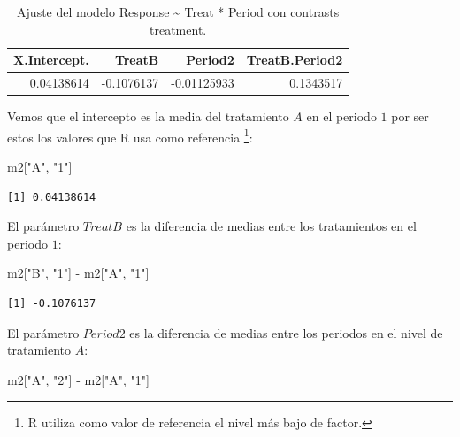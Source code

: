\documentclass[
  12pt,
  a4paper,
  extrafontsizes,
  onecolumn,
  openright,
  table]{memoir}
\newenvironment{Shaded}{\begin{snugshade}}{\end{snugshade}}
\newcommand{\NormalTok}[1]{\textcolor[rgb]{0.00,0.23,0.31}{#1}}
\newcommand{\SpecialCharTok}[1]{\textcolor[rgb]{0.37,0.37,0.37}{#1}}
\newcommand{\StringTok}[1]{\textcolor[rgb]{0.13,0.47,0.30}{#1}}
\begin{document}
\hypertarget{tbl-l2}{}
\begin{longtable}{rrrr}
\caption{\label{tbl-l2}Ajuste del modelo Response \textasciitilde{} Treat * Period con
contrasts treatment. }\tabularnewline

\toprule
X.Intercept. & TreatB & Period2 & TreatB.Period2 \\ 
\midrule
0.04138614 & -0.1076137 & -0.01125933 & 0.1343517 \\ 
\bottomrule
\end{longtable}

\normalsize

Vemos que el intercepto es la media del tratamiento \(A\) en el periodo
\(1\) por ser estos los valores que R usa como referencia \footnote{R
  utiliza como valor de referencia el nivel más bajo de factor.}:

\scriptsize

\begin{Shaded}
\begin{Highlighting}[]
\NormalTok{m2[}\StringTok{"A"}\NormalTok{, }\StringTok{"1"}\NormalTok{]}
\end{Highlighting}
\end{Shaded}

\begin{verbatim}
[1] 0.04138614
\end{verbatim}

\normalsize

El parámetro \(TreatB\) es la diferencia de medias entre los
tratamientos en el periodo \(1\):

\scriptsize

\begin{Shaded}
\begin{Highlighting}[]
\NormalTok{m2[}\StringTok{"B"}\NormalTok{, }\StringTok{"1"}\NormalTok{] }\SpecialCharTok{{-}}\NormalTok{ m2[}\StringTok{"A"}\NormalTok{, }\StringTok{"1"}\NormalTok{]}
\end{Highlighting}
\end{Shaded}

\begin{verbatim}
[1] -0.1076137
\end{verbatim}

\normalsize

El parámetro \(Period2\) es la diferencia de medias entre los periodos
en el nivel de tratamiento \(A\):

\scriptsize

\begin{Shaded}
\begin{Highlighting}[]
\NormalTok{m2[}\StringTok{"A"}\NormalTok{, }\StringTok{"2"}\NormalTok{] }\SpecialCharTok{{-}}\NormalTok{ m2[}\StringTok{"A"}\NormalTok{, }\StringTok{"1"}\NormalTok{]}
\end{Highlighting}
\end{Shaded}
\end{document}
